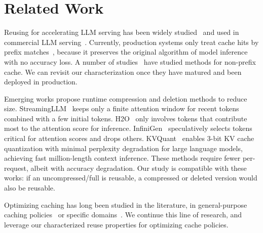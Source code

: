 \section{Related Work}
\label{sec:related}

Reusing {\kvcache} for accelerating LLM serving
has been widely studied~\cite{vllm,chunkattention,cachedattention,promptcache,sglang,cacheblend} and used in commercial LLM serving~\cite{openaiapi,genimiapi,claudeapi,mooncake}.
Currently, production systems only treat cache hits by prefix matches~\cite{chunkattention,sglang,cachedattention,openaiapi,genimiapi,claudeapi,mooncake}, 
because it preserves the original algorithm of model inference with no accuracy loss.
A number of studies~\cite{promptcache,cacheblend,hu2024epic} have studied 
methods for non-prefix {\kvcache} cache. 
We can revisit our characterization once they have matured 
and been deployed in production.

Emerging works\cite{streamingllm,h2o,infinigen,pyramidkv} propose runtime {\kvcache}
compression and deletion methods to reduce {\kvcache} size.
StreamingLLM~\cite{streamingllm} keeps
only a finite attention window for recent tokens combined with a few initial tokens.
H2O~\cite{h2o} only involves tokens that contribute most to the attention score for inference.
InfiniGen~\cite{infinigen} speculatively selects tokens critical for attention scores and drops others.
KVQuant~\cite{KVQuant} enables 3-bit KV cache quantization with minimal perplexity degradation 
for large language models, achieving fast million-length context inference.
These methods require fewer {\kvcache} per-request,
albeit with accuracy degradation.
Our study is compatible with these works:
if an uncompressed/full {\kvcache} is reusable,
a compressed or deleted version would also be reusable.

Optimizing caching has long been studied in the literature,
in general-purpose caching policies~\cite{lruk,slru,twoq,eelru,lrfu,lirs,arc,mq,car,clockpro,DBLP:journals/tos/EinzigerEFM22,lhd,cacheus,sieve,cherkasova1998improving}
or specific domains~\cite{yang2020twemcache,berg2020cachelib,icebreaker,fasscache}.
We continue this line of research,
and leverage our characterized {\kvcache} reuse properties
for optimizing {\kvcache} cache policies.


